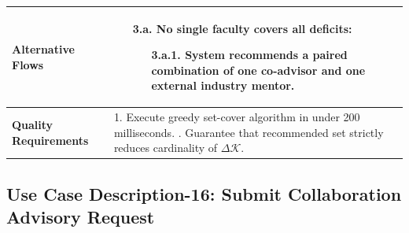 \begin{table}[H]
\begin{tabularx}{\textwidth}{|l|X|}
\textbf{Alternative Flows} &
\begin{itemize}[leftmargin=*]
    \item[\textbf{3.a.}] \textbf{No single faculty covers all deficits:}
    \begin{itemize}[leftmargin=*]
        \item[3.a.1.] System recommends a paired combination of one co-advisor and one external industry mentor.
    \end{itemize}
\end{itemize} \\ \hline
\textbf{Quality Requirements} & 
1. Execute greedy set-cover algorithm in under 200 milliseconds. \newline
2. Guarantee that recommended set strictly reduces cardinality of $\Delta \mathcal{K}$. \\ \hline
\end{tabularx}
\end{table}

\clearpage
\subsection{Use Case Description-16: Submit Collaboration Advisory Request}
\label{subsec:uc16}

